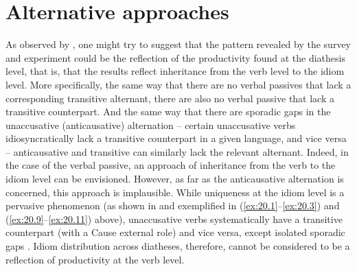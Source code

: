 \documentclass[output=paper]{langsci/langscibook}
\begin{document}
\section{Alternative approaches}\label{sec:20.5} %

As observed by \textcite{SilHorKluWex2018}, one might try to suggest that the
pattern revealed by the survey and experiment could be the reflection of the
productivity found at the diathesis level, that is, that the results reflect
inheritance from the verb level to the idiom level. More specifically, the same
way that there are no verbal passives that lack a corresponding transitive
alternant, there are also no verbal passive  that lack a transitive
counterpart. And the same way that there are sporadic gaps in the unaccusative
(anticausative) alternation – certain unaccusative verbs
idiosyncratically lack a transitive counterpart in a given language, and vice
versa – anticausative and transitive  can similarly lack the
relevant alternant. Indeed, in the case of the verbal passive, an
approach of inheritance from the verb to the idiom level can be envisioned.
However, as far as the anticausative alternation is concerned, this approach is
implausible. While uniqueness at the idiom level is a pervasive
phenomenon (as shown in  and exemplified in
(\ref{ex:20.1}--\ref{ex:20.3}) and
(\ref{ex:20.9}--\ref{ex:20.11}) above),
unaccusative verbs systematically have a transitive
counterpart (with a Cause external role) and vice versa, except isolated
sporadic gaps \parencite{Haspelmath1993,Reinhart2002}.  Idiom distribution
across diatheses, therefore, cannot be considered to be a reflection of
productivity at the verb level.
\end{document}
